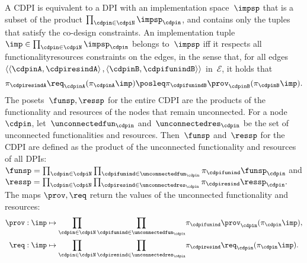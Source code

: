 A CDPI is equivalent to a DPI with an implementation space~$\impsp$
that is a subset of the product $\prod_{\cdpin\in\cdpiN}\impsp_{\cdpin}$,
and contains only the tuples that satisfy the co-design constraints.
An implementation tuple~$\imp\in\prod_{\cdpin\in\cdpiN}\impsp_{\cdpin}$
belongs to~$\impsp$ iff it respects all functionality\textendash resources
constraints on the edges, in the sense that, for all edges~$\left\langle \left\langle \cdpinA,\cdpiresindA\right\rangle ,\left\langle \cdpinB,\cdpifunindB\right\rangle \right\rangle $
in~$\mathcal{E}$, it holds that
\[
  \pi_{\cdpiresindA}\req_{\cdpinA}(\pi_{\cdpinA}\imp)\posleq\pi_{\cdpifunindB}\prov_{\cdpinB}(\pi_{\cdpinB}\imp).
\]
The posets~$\funsp,\ressp$ for the entire CDPI are the products
of the functionality and resources of the nodes that remain unconnected.
For a node~$\cdpin$, let~$\unconnectedfun_{\cdpin}$ and~$\unconnectedres_{\cdpin}$
be the set of unconnected functionalities and resources. Then~$\funsp$
and~$\ressp$ for the CDPI are defined as the product of the unconnected
functionality and resources of all DPIs: $\funsp=\prod_{\cdpin\in\cdpiN}\prod_{\cdpifunind\in\unconnectedfun_{\cdpin}}\pi_{\cdpifunind}\funsp_{\cdpin}$
and $\ressp=\prod_{\cdpin\in\cdpiN}\prod_{\cdpiresind\in\unconnectedres_{\cdpin}}\pi_{\cdpiresind}\ressp_{\cdpin}.$
The maps $\prov,\req$ return the values of the unconnected functionality
and resources:
\begin{align*}
  \prov:\imp & \mapsto{\scriptstyle {\displaystyle \prod_{\cdpin\in\cdpiN}\prod_{\cdpifunind\in\unconnectedfun_{\cdpin}}}}\pi_{\cdpifunind}\prov_{\cdpin}(\pi_{\cdpin}\imp),\\
  \req:\imp & \mapsto{\displaystyle \prod_{\cdpin\in\cdpiN}\prod_{\cdpiresind\in\unconnectedres_{\cdpin}}}\pi_{\cdpiresind}\req_{\cdpin}(\pi_{\cdpin}\imp).
\end{align*}

